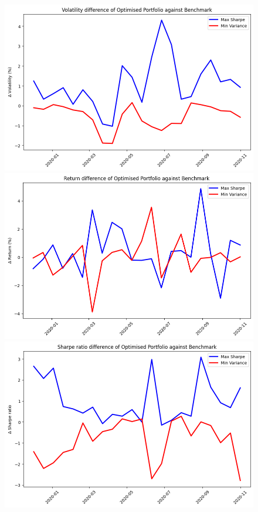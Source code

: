 \documentclass[a4paper,12pt]{article}
\begin{document}
\begin{figure}[H]
    \centering
    \begin{minipage}{0.7\textwidth}
    \centering
    \includegraphics[width=1\textwidth]{resources/Volatility difference of Optimised Portfolio against Benchmark.png}
    \end{minipage}
    \hfill
    \begin{minipage}{0.7\textwidth}
    \centering
    \includegraphics[width=1\textwidth]{resources/Return difference of Optimised Portfolio against Benchmark.png}
    \end{minipage}
    \begin{minipage}{0.7\textwidth}
    \centering
    \includegraphics[width=1\textwidth]{resources/Sharpe Ratio.png}

\end{minipage}
\end{figure}
\end{document}
